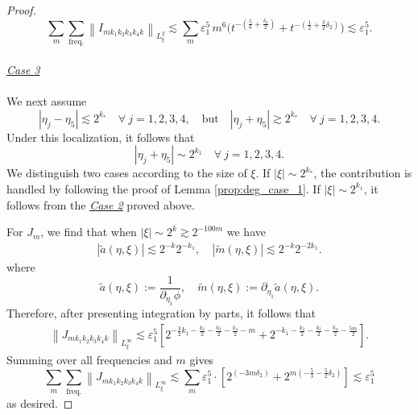 \documentclass[reqno,english,11pt]{amsart}
\newcommand{\eps}{\varepsilon}
\newcommand{\snorm}[1]{\left\|#1\right\|}
\theoremstyle{definition}
\numberwithin{equation}{section}
\begin{document}
\begin{proof}
$$\sum_{m}\sum_{\operatorname{freq.}}\snorm{I_{mk_1k_2k_3k_4k}}_{L^2_\xi}\lesssim \sum_m\eps_1^5\,m^{6}\Big(t^{-(\frac56+\frac{\delta_2}{2})}
 + t^{-(\frac12+\frac{3}{2}\delta_2)}\Big)\lesssim \eps_1^5.$$
\\
\noindent
\underline{\textit{Case 3}}
\\\\
We next assume
$$
\left| \eta_j - \eta_5\right|\lesssim 2^{k_{*}} \quad \forall \ j =1,2,3,4, \quad \text{but} \quad \left| \eta_j + \eta_5\right|\gtrsim 2^{k_{*}} \quad \forall \ j =1,2,3,4. 
$$
Under this localization, it follows that
$$\left| \eta_j + \eta_5\right|\sim 2^{k_{1}} \quad \forall \ j =1,2,3,4. $$
We distinguish two cases according to the size of $\xi$.
If $|\xi| \sim 2^{k_*}$, the contribution is handled by following the proof of Lemma \ref{prop:deg_case_1}.
If $|\xi| \sim 2^{k_1}$, it follows from the \underline{\textit{Case 2}} proved above. 


For $J_m$, we find that when $|\xi|\sim 2^{k}\gtrsim 2^{-100m}$ we have
\begin{align*}
    \left|\tilde{a}(\eta,\xi)\right| \lesssim 2^{-k} 2^{-k_1}, \quad \left|\tilde{m}(\eta,\xi)\right| \lesssim 2^{-k} 2^{-2k_1}.
\end{align*}
where 
$$\tilde{a}(\eta,\xi):=\frac{1}{\partial_{\eta_1}\phi},\quad \tilde{m}(\eta,\xi):=\partial_{\eta_1}\tilde{a}(\eta,\xi).$$
Therefore, after presenting integration by parts, it follows that
\begin{align*}
    \snorm{J_{mk_1k_2k_3k_4k}}_{L^{\infty}_{\xi}} \lesssim \eps_1^5\left[2^{-\frac{3}{2}k_1-\frac{k_2}{2}-\frac{k_3}{2}-\frac{k_4}{2}-m}+2^{-k_1-\frac{k_2}{2}-\frac{k_3}{2}-\frac{k_4}{2}-\frac{5m}{2}}\right].
\end{align*}
Summing over all frequencies and $m$ gives
$$\sum_{m}\sum_{\operatorname{freq.}}\snorm{J_{mk_1k_2k_3k_4k}}_{L^\infty_\xi}\lesssim \sum_{m}\eps_1^5 \cdot\left[2^{(-3m\delta_2)}+2^{m(-\frac{5}{3}-\frac{5}{2}\delta_2)}\right]\lesssim \eps_1^5$$
as desired. 
\end{proof}

\end{document}
